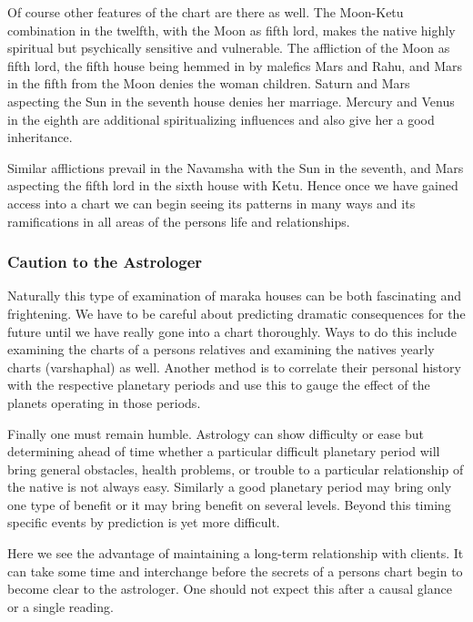  

Of course other features of the chart are there as well. The Moon-Ketu combination in the twelfth, with the Moon as fifth lord, makes the native highly spiritual but psychically sensitive and vulnerable. The affliction of the Moon as fifth lord, the fifth house being hemmed in by malefics Mars and Rahu, and Mars in the fifth from the Moon denies the woman children. Saturn and Mars aspecting the Sun in the seventh house denies her marriage. Mercury and Venus in the eighth are additional spiritualizing influences and also give her a good inheritance.

 

Similar afflictions prevail in the Navamsha with the Sun in the seventh, and Mars aspecting the fifth lord in the sixth house with Ketu. Hence once we have gained access into a chart we can begin seeing its patterns in many ways and its ramifications in all areas of the persons life and relationships.

 

\subsubsection{Caution to the Astrologer}

 

Naturally this type of examination of maraka houses can be both fascinating and frightening. We have to be careful about predicting dramatic consequences for the future until we have really gone into a chart thoroughly. Ways to do this include examining the charts of a persons relatives and examining the natives yearly charts (varshaphal) as well. Another method is to correlate their personal history with the respective planetary periods and use this to gauge the effect of the planets operating in those periods.

 

Finally one must remain humble. Astrology can show difficulty or ease but determining ahead of time whether a particular difficult planetary period will bring general obstacles, health problems, or trouble to a particular relationship of the native is not always easy. Similarly a good planetary period may bring only one type of benefit or it may bring benefit on several levels. Beyond this timing specific events by prediction is yet more difficult.

 

Here we see the advantage of maintaining a long-term relationship with clients. It can take some time and interchange before the secrets of a persons chart begin to become clear to the astrologer. One should not expect this after a causal glance or a single reading.

